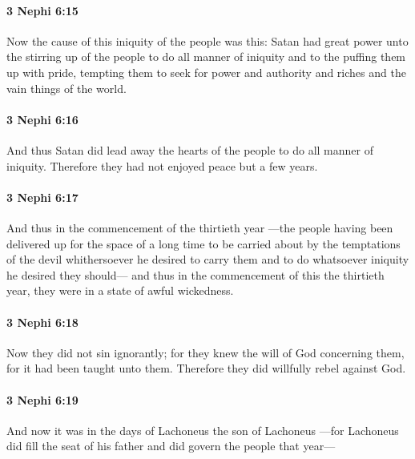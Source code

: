 		\paragraph{3 Nephi 6:15} %
			\label{3NEPHI-6-15}

			Now the cause of this iniquity of the people was this:
			Satan had great power unto the stirring up of the people
			to do all manner of iniquity
			and to the puffing them up with pride,
			tempting them to seek for power and authority
			and riches and the vain things of the world.

		\paragraph{3 Nephi 6:16} %
			\label{3NEPHI-6-16}

			And thus Satan did lead away the hearts of the people to do all manner of iniquity.
			Therefore they had not enjoyed peace but a few years.

		\paragraph{3 Nephi 6:17} %
			\label{3NEPHI-6-17}

			And thus in the commencement of the thirtieth year
			---the people having been delivered up for the space of a long time
			to be carried about by the temptations of the devil
			whithersoever he desired to carry them
			and to do whatsoever iniquity he desired they should---
			and thus in the commencement of this the thirtieth year,
			they were in a state of awful wickedness.

		\paragraph{3 Nephi 6:18} %
			\label{3NEPHI-6-18}

			Now they did not sin ignorantly;
			for they knew the will of God concerning them,
			for it had been taught unto them.
			Therefore they did willfully rebel against God.

		\paragraph{3 Nephi 6:19} %
			\label{3NEPHI-6-19}

			And now it was in the days of Lachoneus the son of Lachoneus
			---for Lachoneus did fill the seat of his father and did govern the people that year---


